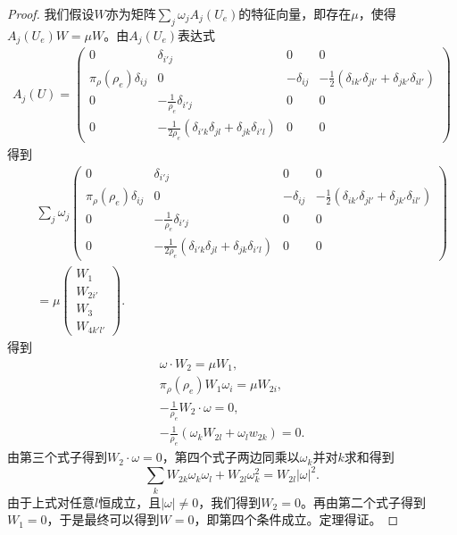 \begin{proof}
	我们假设$W$亦为矩阵$\sum_j \omega_j A_j(U_e)$的特征向量，即存在$\mu$，使得$A_j(U_e) W = \mu W$。由$A_j(U_e)$表达式
	\begin{eqnarray*}
	    A_{j}(U) =
 		\left( \begin{smallmatrix} 
 		0 & \delta_{i'j} & 0 & 0  \\
 		\pi_\rho(\rho_e) \delta_{ij} & 0  &  - \delta_{ij} & -\frac{1}{2}(\delta_{ik'}\delta_{jl'} + \delta_{jk'} \delta_{il'}) \\
 		0 & - \frac{1}{\rho_e} \delta_{i'j} & 0 & 0 \\
 		0 & -\frac{1}{2\rho_e}(\delta_{i'k}\delta_{jl} + \delta_{jk} \delta_{i'l}) & 0 & 0
 		\end{smallmatrix} \right)
 	\end{eqnarray*}
	得到
	\begin{eqnarray*}
		&& \sum_j \omega_j \left( \begin{smallmatrix} 
 		0 & \delta_{i'j} & 0 & 0  \\
 		\pi_\rho(\rho_e) \delta_{ij} & 0  &  - \delta_{ij} & -\frac{1}{2}(\delta_{ik'}\delta_{jl'} + \delta_{jk'} \delta_{il'}) \\
 		0 & - \frac{1}{\rho_e} \delta_{i'j} & 0 & 0 \\
 		0 & -\frac{1}{2\rho_e}(\delta_{i'k}\delta_{jl} + \delta_{jk} \delta_{i'l}) & 0 & 0
 		\end{smallmatrix} \right) \\
 		&& = \mu \left( \begin{array}{c} W_1 \\ W_{2i'} \\W_{3} \\W_{4k'l'} \end{array} \right).
	\end{eqnarray*}
	得到
	\begin{eqnarray*}
		\omega \cdot W_2 = \mu W_1, \\ 
		\pi_{\rho}(\rho_e) W_1 \omega_{i} =\mu W_{2i}, \\
		-\frac{1}{\rho_e} W_2 \cdot \omega  = 0, \\
		-\frac{1}{\rho_e} (\omega_{k}  W_{2l} +  \omega_{l} w_{2k}) = 0.
	\end{eqnarray*}
	由第三个式子得到$W_2 \cdot \omega = 0$，第四个式子两边同乘以$\omega_k$并对$k$求和得到
	\begin{equation*} \label{eq:Womega}
		\sum_k W_{2k} \omega_k \omega_l + W_{2l} \omega_k^2 = W_{2l} |\omega|^2.
	\end{equation*}
	由于上式对任意$l$恒成立，且$|\omega| \neq 0$，我们得到$W_2 = 0$。再由第二个式子得到$W_1=0$，于是最终可以得到$W=0$，即第四个条件成立。定理得证。
	\end{proof}

